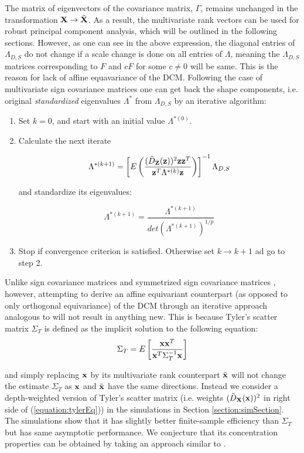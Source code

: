 \documentclass[fleqn,11pt]{article}
\begin{document}
The matrix of eigenvectors of the covariance matrix, $\Gamma$, remains unchanged in the transformation ${\mathbf{X}} \rightarrow \tilde {{\mathbf{X}}}$. As a result, the multivariate rank vectors can be used for robust principal component analysis, which will be outlined in the following sections. However, as one can see in the above expression, the diagonal entries of $\Lambda_{D,S}$ do not change if a scale change is done on all entries of $\Lambda$, meaning the $\Lambda_{D,S}$ matrices corresponding to $F$ and $cF$ for some $c \neq 0$ will be same. This is the reason for lack of affine equavariance of the DCM. Following the case of multivariate sign covariance matrices \citep{taskinen12} one can get back the shape components, i.e. original \textit{standardized} eigenvalues $\Lambda^*$ from $\Lambda_{D,S}$ by an iterative algorithm:

\begin{enumerate}
\item Set $k=0$, and start with an initial value $\Lambda^{*(0)}$.

\item Calculate the next iterate

$$ \Lambda^{*(k+1)} = \left[ E\left( \frac{(\tilde D_{\mathbf{Z}}({\bf{z}}))^2 {\bf{z}} {\bf{z}}^T}{{\bf{z}}^T \Lambda^{*(k)} {\bf{z}}} \right) \right]^{-1} \Lambda_{D,S} $$

and standardize its eigenvalues:

$$ \Lambda^{*(k+1)} = \frac{\Lambda^{*(k+1)}}{det(\Lambda^{*(k+1)})^{1/p}} $$

\item Stop if convergence criterion is satisfied. Otherwise set $k \rightarrow k+1$ ad go to step 2.
\end{enumerate}

Unlike sign covariance matrices and symmetrized sign covariance matrices \citep{dumbgen98}, however, attempting to derive an affine equivariant counterpart (as opposed to only orthogonal equivariance) of the DCM through an iterative approach analogous to \cite{tyler87} will not result in anything new. This is because Tyler's scatter matrix $\Sigma_T$ is defined as the implicit solution to the following equation:
\begin{equation} \label{equation:tylerEq}
\Sigma_T = E \left[ \frac{{\bf{x}} {\bf{x}}^T}{{\bf{x}}^T \Sigma_T^{-1} {\bf{x}}} \right]
\end{equation}

and simply replacing ${\bf{x}}$ by its multivariate rank counterpart $\tilde{{\bf{x}}}$ will not change the estimate $\Sigma_T$ as ${\bf{x}}$ and $\tilde {{\bf{x}}}$ have the same directions. Instead we consider a depth-weighted version of Tyler's scatter matrix (i.e. weights $(\tilde D_{\mathbf{X}}({\bf{x}}))^2$ in right side of (\ref{equation:tylerEq})) in the simulations in Section \ref{section:simSection}. The simulations show that it has slightly better finite-sample efficiency than $\Sigma_T$ but has same asymptotic performance. We conjecture that its concentration properties can be obtained by taking an approach similar to \cite{soloveychik14}.
\end{document}
